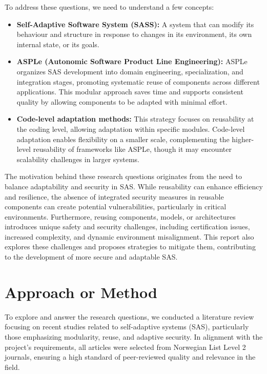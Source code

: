 \documentclass[a4paper,10pt]{article}
\begin{document}
To address these questions, we need to understand a few concepts:

\begin{itemize}
    \item \textbf{Self-Adaptive Software System (SASS):} A system that can modify its behaviour and structure in response to changes in its environment, its own internal state, or its goals.
    \item \textbf{ASPLe (Autonomic Software Product Line Engineering):} ASPLe organizes SAS development into domain engineering, specialization, and integration stages, promoting systematic reuse of components across different applications. This modular approach saves time and supports consistent quality by allowing components to be adapted with minimal effort.
    \item \textbf{Code-level adaptation methods:} This strategy focuses on reusability at the coding level, allowing adaptation within specific modules. Code-level adaptation enables flexibility on a smaller scale, complementing the higher-level reusability of frameworks like ASPLe, though it may encounter scalability challenges in larger systems.
\end{itemize}

The motivation behind these research questions originates from the need to balance adaptability and security in SAS. While reusability can enhance efficiency and resilience, the absence of integrated security measures in reusable components can create potential vulnerabilities, particularly in critical environments. Furthermore, reusing components, models, or architectures introduces unique safety and security challenges, including certification issues, increased complexity, and dynamic environment misalignment. This report also explores these challenges and proposes strategies to mitigate them, contributing to the development of more secure and adaptable SAS.


\section{Approach or Method}

To explore and answer the research questions, we conducted a literature review focusing on recent studies related to self-adaptive systems (SAS), particularly those emphasizing modularity, reuse, and adaptive security. In alignment with the project’s requirements, all articles were selected from Norwegian List Level 2 journals, ensuring a high standard of peer-reviewed quality and relevance in the field.
\end{document}
